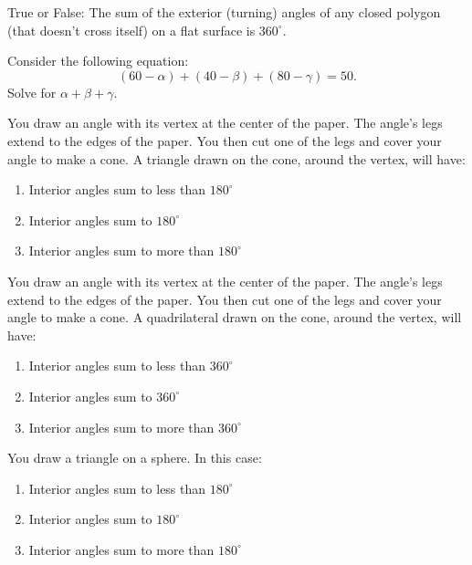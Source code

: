 \documentclass[noauthor,nooutcomes]{ximera}
\author{Claire Merriman \and Bart Snapp}
\begin{document}
\maketitle

\begin{exercise}
 True or False: The sum of the exterior (turning) angles of any closed polygon
 (that doesn't cross itself) on a flat surface is $360^\circ$.
\end{exercise}

\begin{exercise}
 Consider the following equation:
 \[
 (60-\alpha)+(40-\beta)+(80-\gamma)=50.
 \]
 Solve for $\alpha+\beta+\gamma$.
\end{exercise}






\begin{exercise}
 You draw an angle with its vertex at the center of the paper. The angle's legs  
 extend to the edges of the paper. You then cut one of the
 legs and cover your angle to make a cone. 
 A triangle drawn on the cone, around the
 vertex, will have:
 
\begin{enumerate}
 \item Interior angles sum to less than $180^\circ$
 \item Interior angles sum to $180^\circ$
 \item Interior angles sum to more than $180^\circ$
\end{enumerate}
\end{exercise}


\begin{exercise}
  You draw an angle with its vertex at the center of the paper. The angle's legs  
 extend to the edges of the paper. You then cut one of the
 legs and cover your angle to make a cone. 
 A quadrilateral drawn on the cone, around the
 vertex, will have:
 
\begin{enumerate}
 \item Interior angles sum to less than $360^\circ$
 \item Interior angles sum to $360^\circ$
 \item Interior angles sum to more than $360^\circ$
\end{enumerate}
\end{exercise}





\begin{exercise}
  You draw a triangle on a sphere. In this case:
  \begin{enumerate}
  \item Interior angles sum to less than $180^\circ$
  \item Interior angles sum to $180^\circ$
  \item Interior angles sum to more than $180^\circ$
  \end{enumerate}
\end{exercise}


\end{document}
